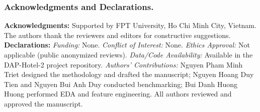\documentclass{llncs}
\begin{document}
\subsubsection*{Acknowledgments and Declarations.}
\noindent\textbf{Acknowledgments:} Supported by FPT University, Ho Chi Minh City, Vietnam. The authors thank the reviewers and editors for constructive suggestions.
\textbf{Declarations:} \textit{Funding:} None. \textit{Conflict of Interest:} None. \textit{Ethics Approval:} Not applicable (public anonymized reviews). \textit{Data/Code Availability:} Available in the DAP-Hotel-2 project repository. \textit{Authors' Contributions:} Nguyen Pham Minh Triet designed the methodology and drafted the manuscript; Nguyen Hoang Duy Tien and Nguyen Bui Anh Duy conducted benchmarking; Bui Danh Huong Huong performed EDA and feature engineering. All authors reviewed and approved the manuscript.

\clearpage


\end{document}
